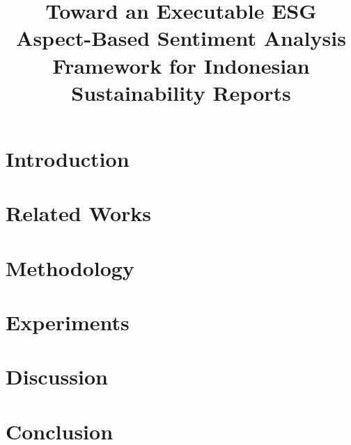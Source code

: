 \documentclass[english, online, cse, master]{dithesis}
\title{Toward an Executable ESG Aspect-Based Sentiment Analysis Framework for Indonesian Sustainability Reports}
\begin{document}
\pagestyle{empty}
\maketitlepage
\makecopyrightpage

 {
  
  
}

\contents %


    
\mainmatter

\chapter{Introduction} %
  \label{introduction} %
    
\chapter{Related Works}
  \label{relatedwork}
  
    
\chapter{Methodology}
  \label{implementation}
  
    
\chapter{Experiments}
  \label{experiments}
  

\chapter{Discussion}
  \label{discussion}
  
  
\chapter{Conclusion}
  \label{summary}
  
    
\printbibliography[heading=bibnumbered, title=\mybibname]

%   
\end{document}
